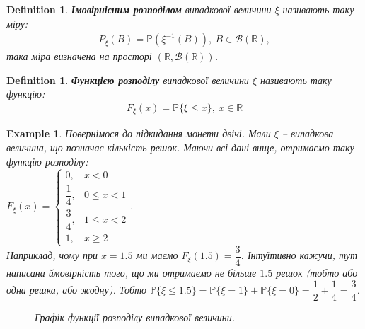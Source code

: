 \documentclass[a4paper, 10pt]{article}
\theoremstyle{theoremdd}
\newtheorem{definition}[theorem]{Definition}
\newtheorem{example}[theorem]{Example}
\begin{document}
\begin{definition}
\textbf{Імовірнісним розподілом} випадкової величини $\xi$ називають таку міру:
\begin{align*}
P_\xi(B) = \mathbb{P}(\xi^{-1}(B)),\ B \in \mathcal{B}(\mathbb{R}),
\end{align*}
така міра визначена на просторі $(\mathbb{R}, \mathcal{B}(\mathbb{R}))$.
\end{definition}

\begin{definition}
\textbf{Функцією розподілу} випадкової величини $\xi$ називають таку функцію:
\begin{align*}
F_\xi(x) = \mathbb{P}\{\xi \leq x\},\ x \in \mathbb{R}
\end{align*}
\end{definition}

\begin{example}
Повернімося до підкидання монети двічі. Мали $\xi$ -- випадкова величина, що позначає кількість решок. Маючи всі дані вище, отримаємо таку функцію розподілу:\\
$F_{\xi}(x) = \begin{cases} 0, & x < 0 \\ \dfrac{1}{4}, & 0 \leq x < 1 \\ \dfrac{3}{4}, & 1 \leq x < 2 \\ 1, & x \geq 2 \end{cases}$.\\
Наприклад, чому при $x = 1.5$ ми маємо $F_\xi(1.5) = \dfrac{3}{4}$. Інтуїтивно кажучи, тут написана ймовірність того, що ми отримаємо не більше $1.5$ решок (тобто або одна решка, або жодну). Тобто $\mathbb{P}\{\xi \leq 1.5\} = \mathbb{P}\{\xi = 1\} + \mathbb{P}\{\xi = 0\} = \dfrac{1}{2} + \dfrac{1}{4} = \dfrac{3}{4}$.
\begin{figure}[H]
\centering
{}
\caption*{Графік функції розподілу випадкової величини.}
\end{figure}
\end{example}
\end{document}
